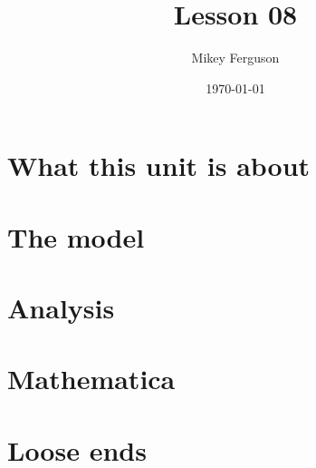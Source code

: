 \documentclass[11pt]{article}
\title{Lesson 08}
\author{Mikey Ferguson}
\date{\today}
\begin{document}
\maketitle
\tableofcontents
\bigskip

\section{What this unit is about}

\section{The model}

\section{Analysis}

\section{Mathematica}

\section{Loose ends}
\end{document}
